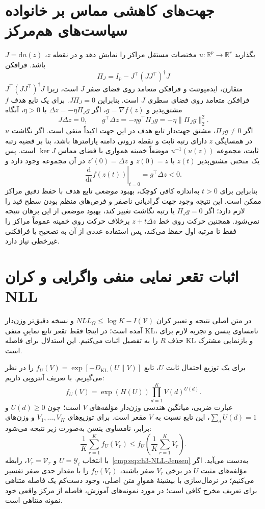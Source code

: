 \section{جهت‌های کاهشی مماس بر خانواده سیاست‌های هم‌مرکز}
\label{app:ch3-policy-center-projection}
بگذارید
$u:\mathbb R^p\to\mathbb R^r$
مختصات مستقل
مراکز را نمایش دهد
و در نقطه $z$،
$J=\mathrm du(z)$
باشد. فرافکن
\[
\Pi_J=I_p-
J^\top(JJ^\top)^\dagger J
\]
متقارن، ایدمپوتنت
و فرافکن متعامد
روی فضای صفر $J$
است، زیرا
$J^\top(JJ^\top)^\dagger J$
فرافکن متعامد
روی فضای سطری
$J$ است.
بنابراین
$J\Pi_J=0$.
برای یک تابع هدف
$f$ مشتق‌پذیر و
$g=\nabla f(z)$،
اگر
$\Delta z=-\eta\Pi_Jg$
با $\eta>0$،
آنگاه
\[
J\Delta z=0,
\qquad
g^\top\Delta z
=-\eta g^\top\Pi_Jg
=-\eta\|\Pi_Jg\|_2^2.
\]
اگر $\Pi_Jg\ne0$،
مشتق جهت‌دار تابع
هدف در این جهت
اکیداً منفی است.
اگر نگاشت $u$
در همسایگی $z$
دارای رتبه ثابت
و نقطه درونی
دامنه پارامترها
باشد، بنا بر
قضیه رتبه ثابت،
مجموعه
$u^{-1}(u(z))$
موضعاً خمینه
همواری با
فضای مماس
$\ker J$ است.
پس یک منحنی
مشتق‌پذیر
$z(t)$ با
$z(0)=z$ و
$z'(0)=\Delta z$
در آن مجموعه
وجود دارد و
\[
\left.\frac{\mathrm d}
{\mathrm dt}f(z(t))
\right|_{t=0}
=g^\top\Delta z<0.
\]
بنابراین برای
$t>0$ به‌اندازه
کافی کوچک،
بهبود \emph{موضعی}
تابع هدف با
حفظ \emph{دقیق}
مراکز ممکن است.
این نتیجه وجود
جهت گرادیانی
ناصفر و فرض‌های
منظم بودن سطح
قید را لازم دارد؛
اگر $\Pi_Jg=0$
یا رتبه نگاشت
تغییر کند،
بهبود موضعی
از این برهان
نتیجه نمی‌شود.
همچنین حرکت
روی خط
$z+t\Delta z$
برخلاف حرکت
روی خمینه
عموماً مراکز
را فقط تا
مرتبه اول
حفظ می‌کند،
پس استفاده
عددی از آن
به تصحیح یا
فرافکنی غیرخطی
نیاز دارد.

\section{اثبات تقعر نمایی منفی واگرایی و کران NLL}
\label{app:ch3-NLL-concavity}
در متن اصلی نتیجه و تعبیر کران
$NLL_\Omega\le \log K-I(\mathcal V)$
و نسخه دقیق‌تر وزن‌دار آمده است؛
در اینجا فقط تقعر تابع نماییِ منفی KL،
نامساوی ینسن و تجزیه لازم برای حذف $R$
را به تفصیل اثبات می‌کنیم. این استدلال
برای فاصله KL و بازنمایی مشترک است.

برای یک توزیع احتمال ثابت $U$، تابع $f_U(V)=\exp[-D_{\mathrm{KL}}(U\|V)]$ را در نظر می‌گیریم. با تعریف آنتروپی داریم:
\begin{equation}\label{eq:app-ch3-f-KL-product}
f_U(V)=\exp(H(U))\prod_{d=1}^{K}V(d)^{U(d)}.
\end{equation}
عبارت ضربی، میانگین هندسی وزن‌دار مؤلفه‌های $V$ است؛ چون $U(d)\ge0$ و $\sum_dU(d)=1$، این تابع نسبت به $V$ مقعر است. برای توزیع‌های $V_1,\ldots,V_K$ و وزن‌های برابر، نامساوی ینسن به‌صورت زیر نتیجه می‌شود:
\begin{equation}\label{eq:app-ch3-NLL-Jensen}
\frac1K\sum_{r=1}^{K}f_U(V_r)
\le f_U\left(\frac1K\sum_{r=1}^{K}V_r\right).
\end{equation}
با انتخاب $U=\mathscr Y_i$ و $V_r=\mathcal V_r$، رابطه~\eqref{cmp:eq:ch3-NLL-Jensen} به‌دست می‌آید. اگر مؤلفه‌های مثبت $U$ در برخی $V_r$ صفر باشند، $f_U(V_r)$ را با مقدار حدی صفر تفسیر می‌کنیم؛ در نرمال‌سازی با بیشینهٔ هموارِ متن اصلی، وجود دست‌کم یک فاصله متناهی برای تعریف مخرج کافی است؛ در مورد نمونه‌های آموزش، فاصله از مرکز واقعی خود نمونه متناهی است.

